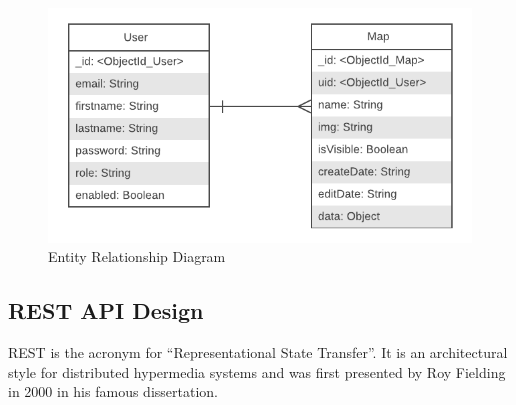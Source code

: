\begin{figure}[htb]
\centering
\includegraphics[width=\textwidth]{section03/assets/ER_Diagram.png}
\caption[Entity Relationship Diagram]{\label{fig:ER Diagram}Entity Relationship Diagram}
\end{figure}

\subsection{REST API Design}
\label{sec:Design>REST API Design}
REST is the acronym for ``Representational State Transfer''. It is an architectural style for distributed hypermedia systems and was first presented by Roy Fielding in 2000 in his famous dissertation.

